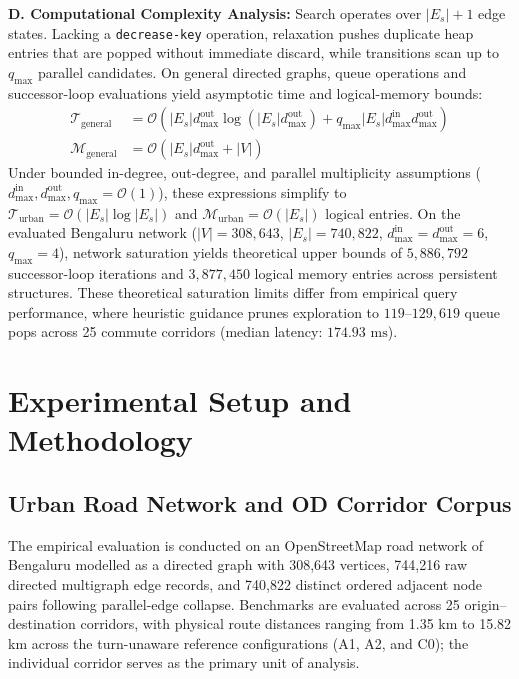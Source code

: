 \documentclass[conference]{IEEEtran}
\begin{document}
\noindent\textbf{D. Computational Complexity Analysis:} Search operates over $|E_s|+1$ edge states. Lacking a \texttt{decrease-key} operation, relaxation pushes duplicate heap entries that are popped without immediate discard, while transitions scan up to $q_{\max}$ parallel candidates. On general directed graphs, queue operations and successor-loop evaluations yield asymptotic time and logical-memory bounds:
\begin{equation}
\label{eq:complexity_bounds}
\begin{aligned}
\mathcal{T}_{\text{general}} &= \mathcal{O}\left( |E_s| d_{\max}^{\text{out}} \log(|E_s| d_{\max}^{\text{out}}) + q_{\max} |E_s| d_{\max}^{\text{in}} d_{\max}^{\text{out}} \right) \\
\mathcal{M}_{\text{general}} &= \mathcal{O}(|E_s| d_{\max}^{\text{out}} + |V|)
\end{aligned}
\end{equation}
Under bounded in-degree, out-degree, and parallel multiplicity assumptions ($d_{\max}^{\text{in}}, d_{\max}^{\text{out}}, q_{\max} = \mathcal{O}(1)$), these expressions simplify to $\mathcal{T}_{\text{urban}} = \mathcal{O}(|E_s| \log |E_s|)$ and $\mathcal{M}_{\text{urban}} = \mathcal{O}(|E_s|)$ logical entries. On the evaluated Bengaluru network ($|V|=308,643$, $|E_s|=740,822$, $d_{\max}^{\text{in}}=d_{\max}^{\text{out}}=6$, $q_{\max}=4$), network saturation yields theoretical upper bounds of $5,886,792$ successor-loop iterations and $3,877,450$ logical memory entries across persistent structures. These theoretical saturation limits differ from empirical query performance, where heuristic guidance prunes exploration to $119$–$129,619$ queue pops across 25 commute corridors (median latency: $174.93\text{ ms}$).

\section{Experimental Setup and Methodology}

\subsection{Urban Road Network and OD Corridor Corpus}

The empirical evaluation is conducted on an OpenStreetMap road network of Bengaluru modelled as a directed graph with 308,643 vertices, 744,216 raw directed multigraph edge records, and 740,822 distinct ordered adjacent node pairs following parallel-edge collapse. Benchmarks are evaluated across 25 origin–destination corridors, with physical route distances ranging from 1.35 km to 15.82 km across the turn-unaware reference configurations (A1, A2, and C0); the individual corridor serves as the primary unit of analysis.
\end{document}
